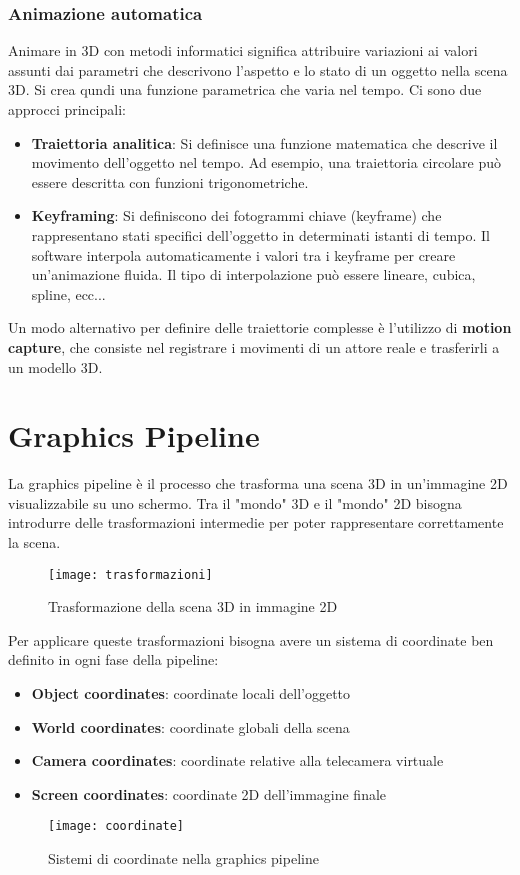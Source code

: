 \documentclass[a4paper]{article}
\begin{document}
\subsubsection{Animazione automatica}
Animare in 3D con metodi informatici significa attribuire variazioni ai valori assunti dai
parametri che descrivono l'aspetto e lo stato di un oggetto nella scena 3D.
Si crea qundi una funzione parametrica che varia nel tempo. Ci sono due approcci principali:
\begin{itemize}
  \item \textbf{Traiettoria analitica}: Si definisce una funzione matematica che descrive il
    movimento dell'oggetto nel tempo. Ad esempio, una traiettoria circolare può essere
    descritta con funzioni trigonometriche.
  \item \textbf{Keyframing}: Si definiscono dei fotogrammi chiave (keyframe) che rappresentano
    stati specifici dell'oggetto in determinati istanti di tempo. Il software interpola
    automaticamente i valori tra i keyframe per creare un'animazione fluida. Il tipo
    di interpolazione può essere lineare, cubica, spline, ecc...
\end{itemize}

\vspace{1em}
\noindent
Un modo alternativo per definire delle traiettorie complesse è l'utilizzo di
\textbf{motion capture}, che consiste nel registrare i movimenti di un attore reale
e trasferirli a un modello 3D.

\section{Graphics Pipeline}
La graphics pipeline è il processo che trasforma una scena 3D in un'immagine 2D visualizzabile
su uno schermo. Tra il "mondo" 3D e il "mondo" 2D bisogna introdurre delle trasformazioni
intermedie per poter rappresentare correttamente la scena.
\begin{figure}[H]
  \centering
  \texttt{[image: trasformazioni]}
  \caption{Trasformazione della scena 3D in immagine 2D}
\end{figure}
\noindent
Per applicare queste trasformazioni bisogna avere un sistema di coordinate ben definito
in ogni fase della pipeline:
\begin{itemize}
  \item \textbf{Object coordinates}: coordinate locali dell'oggetto
  \item \textbf{World coordinates}: coordinate globali della scena
  \item \textbf{Camera coordinates}: coordinate relative alla telecamera virtuale
  \item \textbf{Screen coordinates}: coordinate 2D dell'immagine finale
\end{itemize}
\begin{figure}[H]
  \centering
  \texttt{[image: coordinate]}
  \caption{Sistemi di coordinate nella graphics pipeline}
\end{figure}
\end{document}
